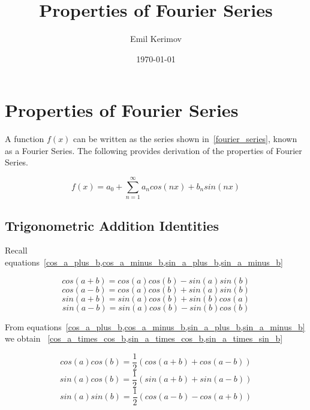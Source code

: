 \documentclass[a4paper]{article}
\title{Properties of Fourier Series}
\author{Emil Kerimov}
\date{\today}
\begin{document}
\maketitle

\section{Properties of Fourier Series}\label{fs:fourier}
A function $f(x)$ can be written as the series shown in~\cref{fourier_series}, known as a Fourier Series. The following provides derivation of the properties of Fourier Series.

\begin{equation}\label{fs:fourier_series}
f(x) = a_0 + \sum\limits_{n=1}^{\infty} a_n cos(n x) + b_n sin(n x)
\end{equation}


\subsection{Trigonometric Addition Identities}\label{fs:trig_identities_addittion}
Recall equations~\cref{cos_a_plus_b,cos_a_minus_b,sin_a_plus_b,sin_a_minus_b}

\begin{equation}\label{fs:cos_a_plus_b}
cos(a+b) = cos(a) cos(b) - sin(a) sin(b)
\end{equation}
\begin{equation}\label{fs:cos_a_minus_b}
cos(a-b) = cos(a) cos(b) + sin(a) sin(b)
\end{equation}
\begin{equation}\label{fs:sin_a_plus_b}
sin(a+b) = sin(a) cos(b) + sin(b) cos(a)
\end{equation}
\begin{equation}\label{fs:sin_a_minus_b}
sin(a-b) = sin(a) cos(b) - sin(b) cos(b)
\end{equation}

From equations~\cref{cos_a_plus_b,cos_a_minus_b,sin_a_plus_b,sin_a_minus_b} we obtain ~\cref{cos_a_times_cos_b,sin_a_times_cos_b,sin_a_times_sin_b}

\begin{equation}\label{fs:cos_a_times_cos_b}
cos(a) cos(b) = \frac{1}{2} (cos(a+b) + cos(a-b))
\end{equation}
\begin{equation}\label{fs:sin_a_times_cos_b}
sin(a) cos(b)  = \frac{1}{2}(sin(a+b) + sin(a-b))
\end{equation}
\begin{equation}\label{fs:sin_a_times_sin_b}
sin(a) sin(b)  = \frac{1}{2}(cos(a-b) - cos(a+b))
\end{equation}
\end{document}

